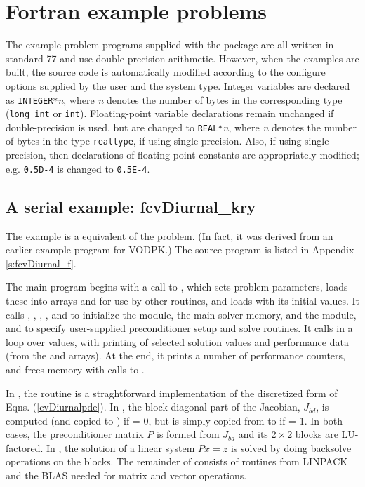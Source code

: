 \section{Fortran example problems}\label{s:ex_fortran}

The {\F} example problem programs supplied with the {\cvode}
package are all written in standard {\F}77 and use double-precision
arithmetic. However, when the {\F} examples are built, the source code is
automatically modified according to the configure options supplied by the
user and the system type. Integer variables are declared as {\tt INTEGER*}{\em n},
where {\em n} denotes the number of bytes in the corresponding {\C} type
({\tt long int} or {\tt int}). Floating-point variable declarations remain
unchanged if double-precision is used, but are changed to {\tt REAL*}{\em n},
where {\em n} denotes the number of bytes in the {\sundials} type {\tt realtype},
if using single-precision. Also, if using single-precision, then declarations of
floating-point constants are appropriately modified; e.g. {\tt 0.5D-4} is
changed to {\tt 0.5E-4}.


\subsection{A serial example: fcvDiurnal\_kry}\label{ss:fcvDiurnal} 
The  example is a {\F} equivalent of the  problem.
(In fact, it was derived from an earlier {\F} example program for VODPK.)
The source program  is listed in Appendix \ref{s:fcvDiurnal_f}.

The main program begins with a call to , which sets problem
parameters, loads these into arrays  and  for use by other
routines, and loads  with its initial values.  It calls ,
, , , and  to
initialize the {\nvecs} module, the main solver memory, and the {\cvspgmr} module,
and to specify user-supplied preconditioner setup and solve routines.
It calls  in a loop over  values, with printing of
selected solution values and performance data (from the   and 
arrays).  At the end, it prints a number of performance counters, and
frees memory with calls to .

In , the  routine is a straghtforward implementation
of the discretized form of Eqns. (\ref{cvDiurnalpde}).  In , the
block-diagonal part of the Jacobian, $J_{bd}$, is computed (and copied to
) if  = 0, but is simply copied from  to  if
 = 1.  In both cases, the preconditioner matrix $P$ is formed from 
$J_{bd}$ and its $2 \times 2$ blocks are LU-factored.  In ,
the solution of a linear system $Px = z$ is solved by doing backsolve
operations on the blocks.  The remainder of  consists of
routines from LINPACK and the BLAS needed for matrix and vector operations.

